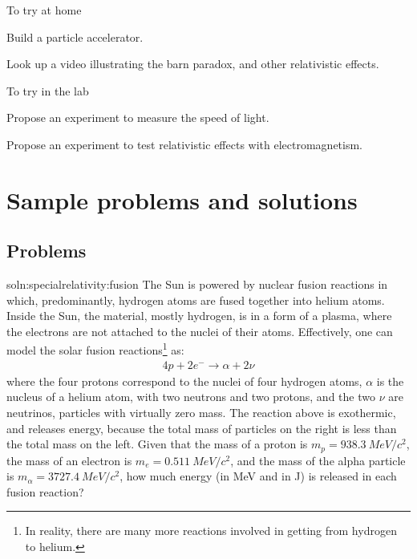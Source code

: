 \begin{chapteractivity}{To try at home}
	{
	\item Build a particle accelerator.
	\item Look up a video illustrating the barn paradox, and other relativistic effects.
	}
\end{chapteractivity}

\begin{chapteractivity}{To try in the lab}
	{
	 \item Propose an experiment to measure the speed of light.
	 \item Propose an experiment to test relativistic effects with electromagnetism.
	}
\end{chapteractivity}

\newpage
\section{Sample problems and solutions}
\subsection{Problems}
\begin{problem}{soln:specialrelativity:fusion}{\label{prob:specialrelativity:fusion} 
The Sun is powered by nuclear fusion reactions in which, predominantly, hydrogen atoms are fused together into helium atoms. Inside the Sun, the material, mostly hydrogen, is in a form of a plasma, where the electrons are not attached to the nuclei of their atoms. Effectively, one can model the solar fusion reactions\footnote{In reality, there are many more reactions involved in getting from hydrogen to helium.} as:
\begin{align*}
4p + 2e^- \to \alpha + 2\nu
\end{align*}
where the four protons correspond to the nuclei of four hydrogen atoms, $\alpha$ is the nucleus of a helium atom, with two neutrons and two protons, and the two $\nu$ are neutrinos, particles with virtually zero mass. The reaction above is exothermic, and releases energy, because the total mass of particles on the right is less than the total mass on the left. Given that the mass of a proton is $m_p=\SI{938.3}{MeV/c^2}$, the mass of an electron is $m_e=\SI{0.511}{MeV/c^2}$, and the mass of the alpha particle is $m_\alpha=\SI{3727.4}{MeV/c^2}$, how much energy (in \si{MeV} and in \si{J}) is released in each fusion reaction?
}
\end{problem}

